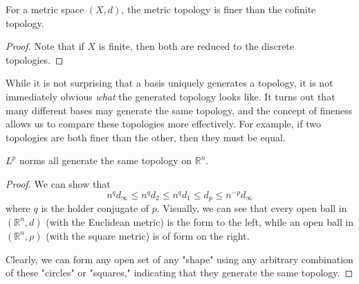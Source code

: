   \begin{theorem}
    For a metric space $(X, d)$, the metric topology is finer than the cofinite topology. 
  \end{theorem} 
  \begin{proof}
    Note that if $X$ is finite, then both are reduced to the discrete topologies. 
  \end{proof}

  While it is not surprising that a basis uniquely generates a topology, it is not immediately obvious \textit{what} the generated topology looks like. It turns out that many different bases may generate the same topology, and the concept of fineness allows us to compare these topologies more effectively. For example, if two topologies are both finer than the other, then they must be equal. 

  \begin{theorem}
    \label{thm:lp-norms-euclidean-topology}
    $L^p$ norms all generate the same topology on $\mathbb{R}^n$. 
  \end{theorem}
  \begin{proof}
    We can show that 
    \begin{equation}
      n^q d_\infty \leq n^q d_2 \leq n^q d_1 \leq d_p \leq n^{-p} d_\infty
    \end{equation}
    where $q$ is the holder conjugate of $p$. Visually, we can see that every open ball in $(\mathbb{R}^n, d)$ (with the Euclidean metric) is the form to the left, while an open ball in $(\mathbb{R}^n, \rho)$ (with the square metric) is of form on the right. 
    \begin{center}
    \end{center}
    Clearly, we can form any open set of any "shape" using any arbitrary combination of these "circles" or "squares," indicating that they generate the same topology. 
  \end{proof}

